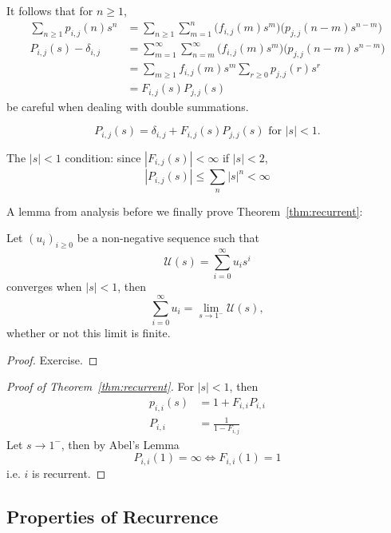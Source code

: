 \documentclass[a4paper]{article}
\begin{document}
It follows that for \(n\geq 1\),
\begin{align*}
  \sum_{n\geq1}^{ } p_{i,j}(n)s^n &= \sum_{n\geq1}^{ } \sum_{m=1}^{n} \Big( f_{i,j}(m)s^m \Big) \Big(p_{j,j}(n-m)s^{n-m} \Big) \\
  P_{i,j}(s) -\delta_{i,j} &= \sum_{m=1}^{\infty} \sum_{n=m}^{\infty} \Big( f_{i,j}(m)s^m \Big) \Big(p_{j,j}(n-m)s^{n-m} \Big) \\
                                  &= \sum_{m\geq1}^{ } f_{i,j}(m)s^m \sum_{r\geq0}^{} p_{j,j}(r)s^r \\
                                  &= F_{i,j}(s) P_{j,j}(s)
\end{align*}
be careful when dealing with double summations.

\begin{theorem}
  \[
    P_{i,j}(s) = \delta_{i,j} + F_{i,j}(s)P_{j,j}(s) \text{ for } |s| < 1.
  \]
\end{theorem}

The \(|s| < 1\) condition: since \(|F_{i,j}(s)| < \infty\) if \(|s| < 2\),
\[
  |P_{i,j}(s)| \leq \sum_{n}^{ }|s|^n < \infty 
\]

A lemma from analysis before we finally prove Theorem~\ref{thm:recurrent}:
 \begin{lemma}
  Let \((u_i)_{i\geq0}\) be a non-negative sequence such that
  \[
    \mathcal U(s) = \sum_{i=0}^{\infty}u_is^i
  \]
  converges when \(|s| <1\), then
  \[
    \sum_{i=0}^{\infty}u_i = \lim_{s\to 1^-} \mathcal U(s),
  \]
  whether or not this limit is finite.
\end{lemma}

\begin{proof}
  Exercise.
\end{proof}

\begin{proof}[Proof of Theorem~\ref{thm:recurrent}]
  For \(|s| < 1\), then
  \begin{align*}
    p_{i,i}(s) &= 1+ F_{i,i}P_{i,i} \\
    P_{i,i} &= \frac{1}{1-F_{i,j}}
  \end{align*}
Let \(s \to 1^-\), then by Abel's Lemma
\begin{equation}
  \label{eqn:recurrent P}
  P_{i,i}(1) = \infty \Leftrightarrow F_{i,i}(1) =1
\end{equation}
i.e. \(i\) is recurrent.
\end{proof}

\subsection{Properties of Recurrence}
\end{document}

